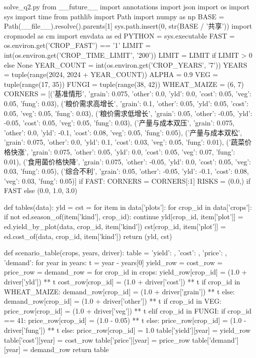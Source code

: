 \documentclass[bwprint]{gmcmthesis}
\begin{document}
\begin{appendices}
\begin{Python}{solve\_q2.py}
from __future__ import annotations
import json
import os
import sys
import time
from pathlib import Path
import numpy as np
BASE = Path(__file__).resolve().parents[1]
sys.path.insert(0, str(BASE / '共享'))
import cropmodel as cm
import envdata as ed
PYTHON = sys.executable
FAST = os.environ.get('CROP_FAST') == '1'
LIMIT = int(os.environ.get('CROP_TIME_LIMIT', '200'))
LIMIT = LIMIT if LIMIT > 0 else None
YEAR_COUNT = int(os.environ.get('CROP_YEARS', '7'))
YEARS = tuple(range(2024, 2024 + YEAR_COUNT))
ALPHA = 0.9
VEG = tuple(range(17, 35))
FUNGI = tuple(range(38, 42))
WHEAT_MAIZE = (6, 7)
CORNERS = [('基准情形', {'grain': 0.075, 'other': 0.0, 'yld': 0.0, 'cost': 0.05, 'veg': 0.05, 'fung': 0.03}), ('粮价需求高增长', {'grain': 0.1, 'other': 0.05, 'yld': 0.05, 'cost': 0.05, 'veg': 0.05, 'fung': 0.03}), ('粮价需求低增长', {'grain': 0.05, 'other': -0.05, 'yld': -0.05, 'cost': 0.05, 'veg': 0.05, 'fung': 0.03}), ('产量与成本双压', {'grain': 0.075, 'other': 0.0, 'yld': -0.1, 'cost': 0.08, 'veg': 0.05, 'fung': 0.05}), ('产量与成本双松', {'grain': 0.075, 'other': 0.0, 'yld': 0.1, 'cost': 0.03, 'veg': 0.05, 'fung': 0.01}), ('蔬菜价格快涨', {'grain': 0.075, 'other': 0.05, 'yld': 0.0, 'cost': 0.05, 'veg': 0.07, 'fung': 0.01}), ('食用菌价格快降', {'grain': 0.075, 'other': -0.05, 'yld': 0.0, 'cost': 0.05, 'veg': 0.03, 'fung': 0.05}), ('综合不利', {'grain': 0.05, 'other': -0.05, 'yld': -0.1, 'cost': 0.08, 'veg': 0.03, 'fung': 0.05})]
if FAST:
    CORNERS = CORNERS[:1]
RISKS = (0.0,) if FAST else (0.0, 1.0, 3.0)

def tables(data):
    yld = {}
    cst = {}
    for item in data['plots']:
        for crop_id in data['crops']:
            if not ed.season_of(item['kind'], crop_id):
                continue
            yld[crop_id, item['plot']] = ed.yield_by_plot(data, crop_id, item['kind'])
            cst[crop_id, item['plot']] = ed.cost_of(data, crop_id, item['kind'])
    return (yld, cst)

def scenario_table(crops, years, driver):
    table = {'yield': {}, 'cost': {}, 'price': {}, 'demand': {}}
    for year in years:
        t = year - years[0]
        yield_row = {}
        cost_row = {}
        price_row = {}
        demand_row = {}
        for crop_id in crops:
            yield_row[crop_id] = (1.0 + driver['yld']) ** t
            cost_row[crop_id] = (1.0 + driver['cost']) ** t
            if crop_id in WHEAT_MAIZE:
                demand_row[crop_id] = (1.0 + driver['grain']) ** t
            else:
                demand_row[crop_id] = (1.0 + driver['other']) ** t
            if crop_id in VEG:
                price_row[crop_id] = (1.0 + driver['veg']) ** t
            elif crop_id in FUNGI:
                if crop_id == 41:
                    price_row[crop_id] = (1.0 - 0.05) ** t
                else:
                    price_row[crop_id] = (1.0 - driver['fung']) ** t
            else:
                price_row[crop_id] = 1.0
        table['yield'][year] = yield_row
        table['cost'][year] = cost_row
        table['price'][year] = price_row
        table['demand'][year] = demand_row
    return table


\end{Python}
\end{appendices}
\end{document}
